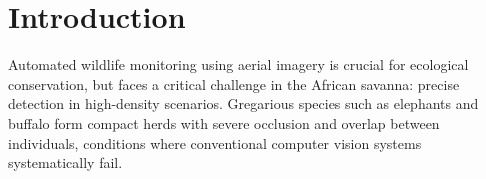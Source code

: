 %
%
%

\section{Introduction}
Automated wildlife monitoring using aerial imagery is crucial for ecological conservation, but faces a critical challenge in the African savanna: precise detection in high-density scenarios. Gregarious species such as elephants and buffalo form compact herds with severe occlusion and overlap between individuals, conditions where conventional computer vision systems systematically fail.

